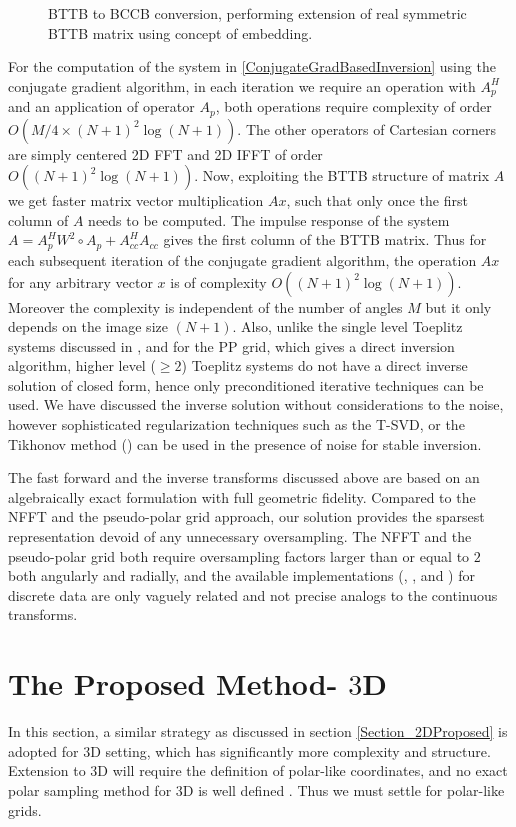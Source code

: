 \documentclass{UCF_ETD}
\begin{document}
\begin{figure}[H]
\begin{center}
 \caption{BTTB to BCCB conversion, performing extension of real symmetric BTTB matrix using concept of embedding.}
 \label{BTTBToBCCB.fig}
 \end{center}
 \end{figure}
 
 For the computation of the system  in \eqref{ConjugateGradBasedInversion} using the conjugate gradient algorithm, in each iteration we require an operation with $A^H_p$  and an application of operator $A_p$, both operations require complexity of order $O(M/4\times (N+1)^2\log(N+1))$. The other operators of Cartesian corners are simply centered 2D FFT and 2D IFFT of order $O((N+1)^2\log(N+1))$. Now, exploiting the BTTB structure of matrix $A$ we get faster matrix vector multiplication $Ax$, such that only once the first column of $A$ needs to be computed. The impulse response of the system $A =  A^H_pW^2\circ A_p + A^H_{cc}A_{cc}$  gives the first column of the BTTB matrix. Thus for each subsequent iteration of the conjugate gradient algorithm, the operation $Ax$ for any arbitrary vector $x$  is of complexity $O((N+1)^2\log(N+1))$. Moreover the complexity is independent of the number of angles $M$ but it only depends on the image size $(N+1)$. Also, unlike the single level Toeplitz systems discussed in \cite{Amir2008}, \cite{Amir_II_2008} and \cite{Amir2015} for the PP grid, which gives a direct inversion algorithm, higher level ($\geq 2$) Toeplitz systems do not have a direct inverse solution of closed form, hence only preconditioned iterative techniques can be used. We have discussed the inverse solution without considerations to the noise, however sophisticated regularization techniques such as the T-SVD, or the Tikhonov method (\cite{Hansen2006}) can be used in the presence of noise for stable inversion.
 
 The fast forward and the inverse transforms discussed above are based on an algebraically exact formulation with full geometric fidelity. Compared to the NFFT and the pseudo-polar grid approach, our solution provides the sparsest representation devoid of any unnecessary oversampling. The NFFT and the pseudo-polar grid both require oversampling factors larger than or equal to $2$ both angularly and radially, and the available implementations (\cite{Amir2006}, \cite{Markus2007}, \cite{Amir2001} and \cite{Amir2003}) for discrete data are only vaguely related and not precise analogs to the continuous transforms.
 
 \section{The Proposed Method- $3$D}\label{Section_3DProposed}
 In this section, a similar strategy as discussed in section \ref{Section_2DProposed} is adopted for $3$D setting, which has significantly more complexity and structure. Extension to 3D will require the definition of polar-like coordinates, and no exact polar sampling method for $3$D is well defined \cite{Amir2006}. Thus we must settle for polar-like grids.
 
\end{document}
